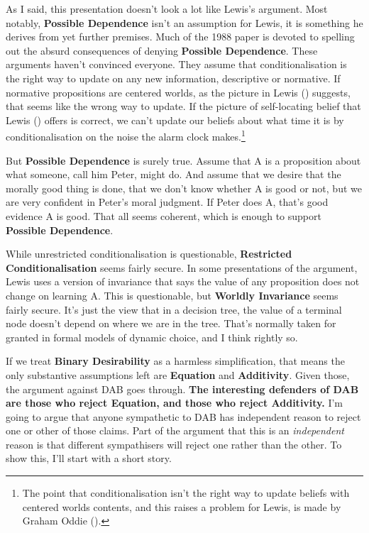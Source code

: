 \documentclass[
  11pt,
  letterpaper,
  DIV=11,
  numbers=noendperiod,
  twoside]{scrartcl}
\begin{document}
As I said, this presentation doesn't look a lot like Lewis's argument.
Most notably, \textbf{Possible Dependence} isn't an assumption for
Lewis, it is something he derives from yet further premises. Much of the
1988 paper is devoted to spelling out the absurd consequences of denying
\textbf{Possible Dependence}. These arguments haven't convinced
everyone. They assume that conditionalisation is the right way to update
on any new information, descriptive or normative. If normative
propositions are centered worlds, as the picture in Lewis
() suggests, that seems like the wrong
way to update. If the picture of self-locating belief that Lewis
() offers is correct, we can't update our
beliefs about what time it is by conditionalisation on the noise the
alarm clock makes.\footnote{The point that conditionalisation isn't the
  right way to update beliefs with centered worlds contents, and this
  raises a problem for Lewis, is made by Graham Oddie
  ().}

But \textbf{Possible Dependence} is surely true. Assume that A is a
proposition about what someone, call him Peter, might do. And assume
that we desire that the morally good thing is done, that we don't know
whether A is good or not, but we are very confident in Peter's moral
judgment. If Peter does A, that's good evidence A is good. That all
seems coherent, which is enough to support \textbf{Possible Dependence}.

While unrestricted conditionalisation is questionable,
\textbf{Restricted Conditionalisation} seems fairly secure. In some
presentations of the argument, Lewis uses a version of invariance that
says the value of any proposition does not change on learning A. This is
questionable, but \textbf{Worldly Invariance} seems fairly secure. It's
just the view that in a decision tree, the value of a terminal node
doesn't depend on where we are in the tree. That's normally taken for
granted in formal models of dynamic choice, and I think rightly so.

If we treat \textbf{Binary Desirability} as a harmless simplification,
that means the only substantive assumptions left are \textbf{Equation}
and \textbf{Additivity}. Given those, the argument against DAB goes
through. {\bfseries\boldmath{}The interesting defenders of DAB are those
who reject \textbf{Equation}, and those who reject \textbf{Additivity}.}
I'm going to argue that anyone sympathetic to DAB has independent reason
to reject one or other of those claims. Part of the argument that this
is an \emph{independent} reason is that different sympathisers will
reject one rather than the other. To show this, I'll start with a short
story.
\end{document}
